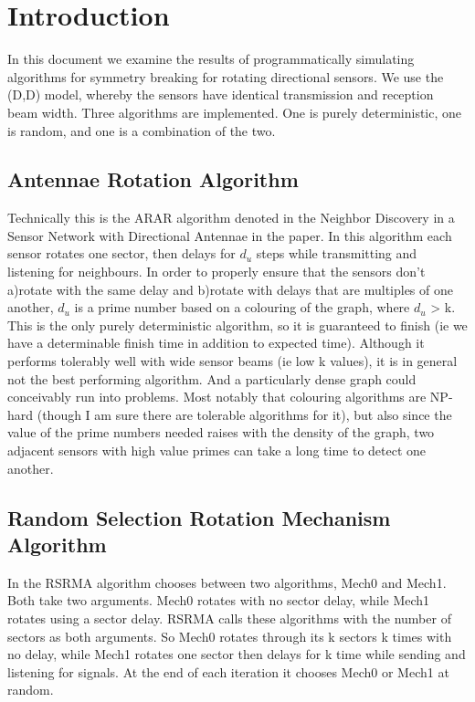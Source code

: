 \section{Introduction}
In this document we examine the results of programmatically simulating algorithms for symmetry breaking for rotating directional sensors. We use the (D,D) model, whereby the sensors have identical transmission and reception beam width. Three algorithms are implemented. One is purely deterministic, one is random, and one is a combination of the two. 

\subsection{Antennae Rotation Algorithm}
Technically this is the ARAR algorithm denoted in the Neighbor Discovery in a Sensor Network with Directional Antennae in the paper.
In this algorithm each sensor rotates one sector, then delays for $d_{u}$ steps while transmitting and listening for neighbours. In order to properly ensure that the sensors don't a)rotate with the same delay and b)rotate with delays that are multiples of one another, $d_{u}$ is a prime number based on a colouring of the graph, where  $d_{u}$ > k. This is the only purely deterministic algorithm, so it is guaranteed to finish (ie we have a determinable finish time in addition to expected time). Although it performs tolerably well with wide sensor beams (ie low k values), it is in general not the best performing algorithm. And a particularly dense graph could conceivably run into problems. Most notably that colouring algorithms are NP-hard (though I am sure there are tolerable algorithms for it), but also since the value of the prime numbers needed raises with the density of the graph, two adjacent sensors with high value primes can take a long time to detect one another. 

\subsection{Random Selection Rotation Mechanism Algorithm}
In the RSRMA algorithm chooses between two algorithms, Mech0 and Mech1. Both take two arguments. Mech0 rotates with no sector delay, while Mech1 rotates using a sector delay. RSRMA calls these algorithms with the number of sectors as both arguments. So Mech0 rotates through its k sectors k times with no delay, while Mech1 rotates one sector then delays for k time while sending and listening for signals. At the end of each iteration it chooses Mech0 or Mech1 at random.

